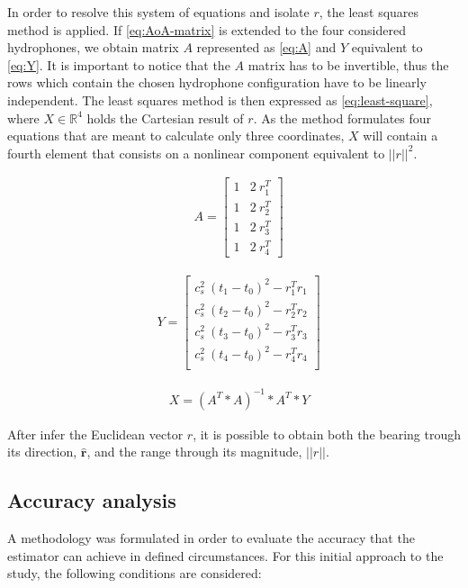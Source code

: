 In order to resolve this system of equations and isolate $r$, the least squares method is applied. If \ref{eq:AoA-matrix} is extended to the four considered hydrophones, we obtain matrix $A$ represented as \ref{eq:A} and $Y$ equivalent to \ref{eq:Y}. It is important to notice that the $A$ matrix has to be invertible, thus the rows which contain the chosen hydrophone configuration have to be linearly independent. The least squares method is then expressed as \ref{eq:least-square}, where $X \in \mathbb{R}^{4}$ holds the Cartesian result of $r$. As the method formulates four equations that are meant to calculate only three coordinates, $X$ will contain a fourth element that consists on a nonlinear component equivalent to $||r||^{2}$.

\begin{eqnarray}
& A = 
\begin{bmatrix}
1 & 2\: r_1^{T}\\
1 & 2\: r_2^{T}\\
1 & 2\: r_3^{T}\\
1 & 2\: r_4^{T}
\end{bmatrix}
\label{eq:A}
\end{eqnarray}

\begin{eqnarray}
& Y = 
\begin{bmatrix}
c_s^{2}\: (t_1-t_0)^2 - r_1^{T} r_1\\
c_s^{2}\: (t_2-t_0)^2 - r_2^{T} r_2\\
c_s^{2}\: (t_3-t_0)^2 - r_3^{T} r_3\\
c_s^{2}\: (t_4-t_0)^2 - r_4^{T} r_4\\
\end{bmatrix}
\label{eq:Y}
\end{eqnarray}

\begin{eqnarray}
& X = (A^{T}*A)^{-1}*A^{T}*Y
\label{eq:least-square}
\end{eqnarray}

After infer the Euclidean vector $r$, it is possible to obtain both the bearing trough its direction, $\hat{\boldsymbol{r}}$, and the range through its magnitude, $||r||$.

\subsection{Accuracy analysis}  \label{subchap:acc-analy}

A methodology was formulated in order to evaluate the accuracy that the estimator can achieve in defined circumstances. For this initial approach to the study, the following conditions are considered: 

